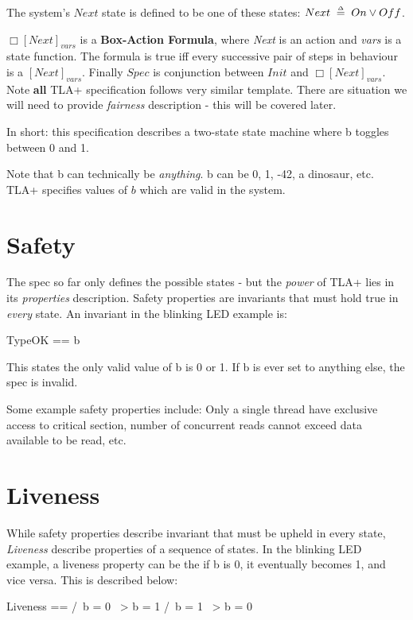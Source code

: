 \documentclass{report}
\begin{document}
The system's $Next$ state is defined to be one of these states:\newline
$Next \;\mathrel{\smash {{\stackrel{\scriptscriptstyle\Delta}{=}}}}\; On \lor Off$.\newline

$\Box[Next]_{vars}$ is a \textbf{Box-Action Formula}, where \textit{Next} is an
action and \textit{vars} is a state function. The formula is true iff every
successive pair of steps in behaviour is a $[Next]_{vars}$. Finally $Spec$ is
conjunction between $Init$ and $\Box[Next]_{vars}$. Note \textbf{all} TLA+
specification follows very similar template. There are situation we will need to
provide \textit{fairness} description - this will be covered later. \newline

In short: this specification describes a two-state state machine where b toggles
between 0 and 1.\newline

Note that b can technically be \textit{anything}. b can be 0, 1, -42, a
dinosaur, etc. TLA+ specifies values of $b$ which are valid in the system.

\section{Safety}

The spec so far only defines the possible states - but the \textit{power} of
TLA+ lies in its \textit{properties} description. Safety properties are
invariants that must hold true in \textit{every} state. An invariant in the
blinking LED example is: 
\begin{tla}
    TypeOK == b 
\end{tla}
\begin{tlatex}
%
\end{tlatex}

This states the only valid value of b is 0 or 1. If b is ever set to anything
else, the spec is invalid.\newline

Some example safety properties include: Only a single thread have exclusive
access to critical section, number of concurrent reads cannot exceed data
available to be read, etc. 

\section{Liveness}

While safety properties describe invariant that must be upheld in every state,
\textit{Liveness} describe properties of a sequence of states. In the blinking
LED example, a liveness property can be the if b is 0, it eventually becomes 1,
and vice versa. This is described below:
\begin{tla}
    Liveness == 
        /\ b = 0 ~> b = 1
        /\ b = 1 ~> b = 0
\end{tla}
\begin{tlatex}
%
%
%
\end{tlatex}
\end{document}
